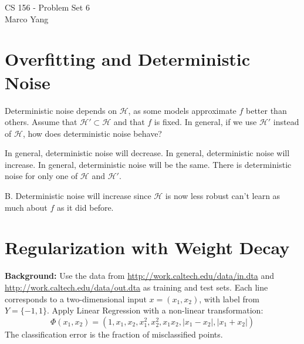 \documentclass[answers]{exam}
\begin{document}
\begin{center}
{\Large CS 156 - Problem Set 6} \\
\medskip
Marco Yang \\
\bigskip
\end{center}

\section*{Overfitting and Deterministic Noise}

\begin{questions}
\question Deterministic noise depends on $\mathcal{H}$, as some models 
approximate $f$ better than others. Assume that $\mathcal{H}' \subset 
\mathcal{H}$ and that $f$ is fixed. In general, if we use $\mathcal{H}'$ instead 
of $\mathcal{H}$, how does deterministic noise behave?

\begin{choices}
\choice In general, deterministic noise will decrease.
\choice In general, deterministic noise will increase.
\choice In general, deterministic noise will be the same.
\choice There is deterministic noise for only one of $\mathcal{H}$ and 
$\mathcal{H}'$.
\end{choices}

\begin{solution}
B. Deterministic noise will increase since $\mathcal{H}$ is now less robust
can't learn as much about $f$ as it did before.
\end{solution}
\end{questions}

\section*{Regularization with Weight Decay}

\textbf{Background:} Use the data from 
\url{http://work.caltech.edu/data/in.dta} and 
\url{http://work.caltech.edu/data/out.dta} as training and test sets. 
Each line corresponds to a two-dimensional input $x = (x_1, x_2)$, with 
label from $Y = \{-1, 1\}$. Apply Linear Regression with a non-linear 
transformation:
\[
\Phi(x_1, x_2) = (1, x_1, x_2, x_1^2, x_2^2, x_1 x_2, |x_1 - x_2|, |x_1 + x_2|)
\]
The classification error is the fraction of misclassified points.






\end{document}
